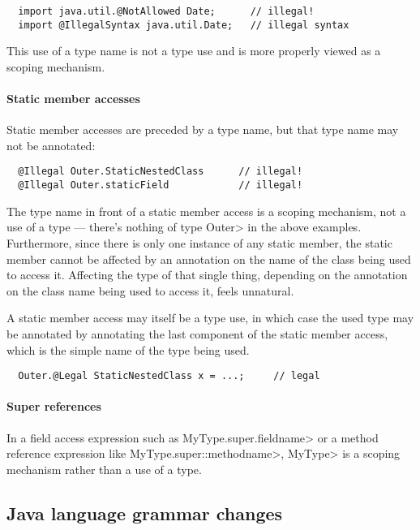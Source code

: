 \documentclass[10pt]{article}
\newcommand{\preverbnegspace}{\vspace{-5pt}}
\begin{document}
\preverbnegspace
\begin{Verbatim}
  import java.util.@NotAllowed Date;      // illegal!
  import @IllegalSyntax java.util.Date;   // illegal syntax
\end{Verbatim}
\preverbnegspace

\noindent
This use of a type name is not a type use and is more properly viewed as
a scoping mechanism.

\paragraph{Static member accesses}

Static member accesses are preceded by a type name, but that type name may
not be annotated:

\preverbnegspace
\begin{Verbatim}
  @Illegal Outer.StaticNestedClass      // illegal!
  @Illegal Outer.staticField            // illegal!
\end{Verbatim}
\preverbnegspace

The type name in front of a static member access is a scoping mechanism,
not a use of a type --- there's nothing of type \<Outer> in the above
examples.  Furthermore, since there is only one instance of any static
member, the static member cannot be affected by an annotation on the name of
the class being used to access it.  Affecting the type of that single
thing, depending on the annotation on the class name being used to access
it, feels unnatural.

A static member access may itself be a type use, in which case the used
type may be annotated by annotating the last component of the static member
access, which is the simple name of the type being used.

\preverbnegspace
\begin{Verbatim}
  Outer.@Legal StaticNestedClass x = ...;     // legal
\end{Verbatim}
\preverbnegspace

\paragraph{Super references}

In a field access expression such as \<MyType.super.fieldname> or a method
reference expression like \<MyType.super::methodname>, \<MyType> is a
scoping mechanism rather than a use of a type.


\subsection{Java language grammar changes\label{grammar}}
\end{document}
